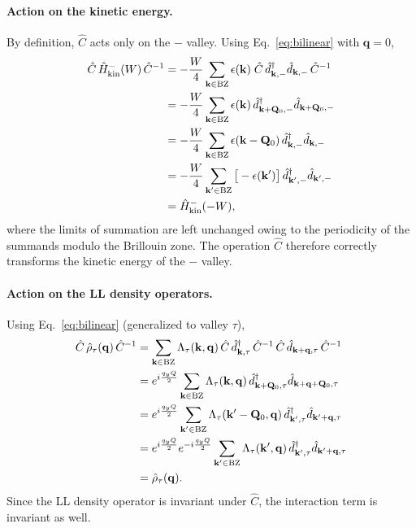 \paragraph{Action on the kinetic energy.}
By definition, $\hat{C}$ acts only on the $-$ valley. Using Eq.~\eqref{eq:bilinear} with $\mathbf{q}=0$,
\begin{align}
    \hat{C}\, \hat{H}_{\text{kin}}^-(W) \,\hat{C}^{-1}
    &= -\frac{W}{4} \sum_{\mathbf{k} \in \mathrm{BZ}} \epsilon(\mathbf{k})\; \hat{C}\, \hat{d}_{\mathbf{k},-}^\dagger \hat{d}_{\mathbf{k},-} \,\hat{C}^{-1} \notag \\
    &= -\frac{W}{4} \sum_{\mathbf{k} \in \mathrm{BZ}} \epsilon(\mathbf{k})\, \hat{d}_{\mathbf{k} + \mathbf{Q}_0,-}^\dagger \hat{d}_{\mathbf{k} + \mathbf{Q}_0,-} \notag \\
    &= -\frac{W}{4} \sum_{\mathbf{k} \in \mathrm{BZ}} \epsilon(\mathbf{k} - \mathbf{Q}_0)\, \hat{d}_{\mathbf{k},-}^\dagger \hat{d}_{\mathbf{k},-} \notag \\
    &= -\frac{W}{4} \sum_{\mathbf{k}' \in \mathrm{BZ}} \big[-\epsilon(\mathbf{k}')\big]\, \hat{d}_{\mathbf{k}',-}^\dagger \hat{d}_{\mathbf{k}',-} \notag \\
    &= \hat{H}_{\text{kin}}^-(-W),
\end{align}
where the limits of summation are left unchanged owing to the periodicity of the summands modulo the Brillouin zone. The operation $\hat{C}$ therefore correctly transforms the kinetic energy of the $-$ valley.

\paragraph{Action on the LL density operators.}
Using Eq.~\eqref{eq:bilinear} (generalized to valley $\tau$),
\begin{align}
    \hat{C}\, \hat{\rho}_\tau(\mathbf{q})\, \hat{C}^{-1}
    &= \sum_{\mathbf{k} \in \mathrm{BZ}} \Lambda_\tau(\mathbf{k}, \mathbf{q})\, \hat{C}\, \hat{d}^\dagger_{\mathbf{k},\tau}\, \hat{C}^{-1}\, \hat{C}\, \hat{d}_{\mathbf{k} + \mathbf{q},\tau}\, \hat{C}^{-1} \notag \\
    &= e^{i\frac{q_y Q}{2}} \sum_{\mathbf{k} \in \mathrm{BZ}} \Lambda_\tau(\mathbf{k}, \mathbf{q})\, \hat{d}^\dagger_{\mathbf{k} + \mathbf{Q}_0,\tau} \hat{d}_{\mathbf{k} + \mathbf{q} + \mathbf{Q}_0,\tau} \notag \\
    &= e^{i\frac{q_y Q}{2}} \sum_{\mathbf{k}' \in \mathrm{BZ}} \Lambda_\tau(\mathbf{k}' - \mathbf{Q}_0, \mathbf{q})\, \hat{d}^\dagger_{\mathbf{k}',\tau} \hat{d}_{\mathbf{k}' + \mathbf{q},\tau} \notag \\
    &= e^{i\frac{q_y Q}{2}} e^{-i\frac{q_y Q}{2}} \sum_{\mathbf{k}' \in \mathrm{BZ}} \Lambda_\tau(\mathbf{k}', \mathbf{q})\, \hat{d}^\dagger_{\mathbf{k}',\tau} \hat{d}_{\mathbf{k}' + \mathbf{q},\tau} \notag \\
    &= \hat{\rho}_\tau(\mathbf{q}).
\end{align}
Since the LL density operator is invariant under $\hat{C}$, the interaction term is invariant as well.

